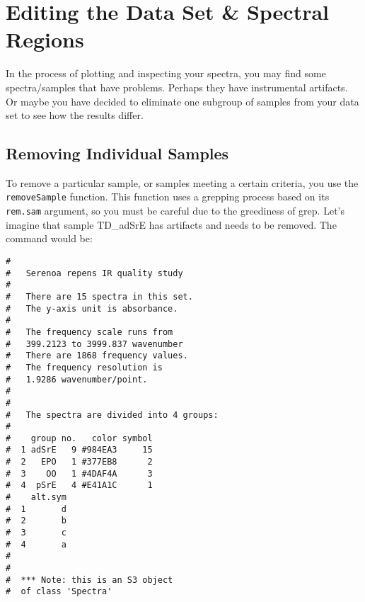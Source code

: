 \documentclass[letter,10pt,twocolumn,twoside,printwatermark=false]{pinp}
\begin{document}
\hypertarget{editing-the-data-set-spectral-regions}{%
\section{Editing the Data Set \& Spectral
Regions}\label{editing-the-data-set-spectral-regions}}

In the process of plotting and inspecting your spectra, you may find
some spectra/samples that have problems. Perhaps they have instrumental
artifacts. Or maybe you have decided to eliminate one subgroup of
samples from your data set to see how the results differ.

\hypertarget{removing-individual-samples}{%
\subsection{Removing Individual
Samples}\label{removing-individual-samples}}

To remove a particular sample, or samples meeting a certain criteria,
you use the \texttt{removeSample} function. This function uses a
grepping process based on its \texttt{rem.sam} argument, so you must be
careful due to the greediness of grep. Let's imagine that sample
TD\_adSrE has artifacts and needs to be removed. The command would be:

\begin{Shaded}
\begin{Highlighting}[]
\StringTok{ }
   \NormalTok{(}\NormalTok{))}
\end{Highlighting}
\end{Shaded}

\begin{ShadedResult}
\begin{verbatim}
#  
#   Serenoa repens IR quality study 
#  
#   There are 15 spectra in this set.
#   The y-axis unit is absorbance.
#  
#   The frequency scale runs from
#   399.2123 to 3999.837 wavenumber
#   There are 1868 frequency values.
#   The frequency resolution is
#   1.9286 wavenumber/point.
#  
#  
#   The spectra are divided into 4 groups: 
#  
#    group no.   color symbol
#  1 adSrE   9 #984EA3     15
#  2   EPO   1 #377EB8      2
#  3    OO   1 #4DAF4A      3
#  4  pSrE   4 #E41A1C      1
#    alt.sym
#  1       d
#  2       b
#  3       c
#  4       a
#  
#  
#  *** Note: this is an S3 object
#  of class 'Spectra'
\end{verbatim}
\end{ShadedResult}
\end{document}
